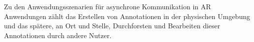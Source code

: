\cite[S.~362]{DieterSchmalstieg2016} Zu den Anwendungsszenarien für asynchrone Kommunikation in AR Anwendungen zählt das Erstellen von Annotationen in der 
physischen Umgebung und das spätere, an Ort und Stelle, Durchforsten und Bearbeiten dieser Annotationen durch andere Nutzer.		


